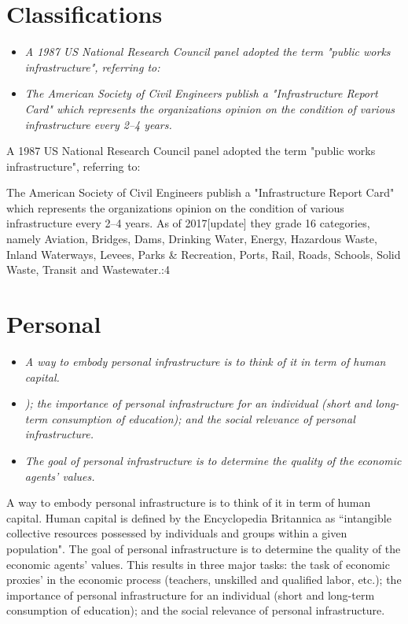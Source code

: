 \section{Classifications}\label{classifications}

\begin{itemize}
\item
  \emph{A 1987 US National Research Council panel adopted the term
  "public works infrastructure", referring to:}
\item
  \emph{The American Society of Civil Engineers publish a
  "Infrastructure Report Card" which represents the organizations
  opinion on the condition of various infrastructure every 2--4 years.}
\end{itemize}

A 1987 US National Research Council panel adopted the term "public works
infrastructure", referring to:

The American Society of Civil Engineers publish a "Infrastructure Report
Card" which represents the organizations opinion on the condition of
various infrastructure every 2--4 years. As of 2017{[}update{]} they
grade 16 categories, namely Aviation, Bridges, Dams, Drinking Water,
Energy, Hazardous Waste, Inland Waterways, Levees, Parks \& Recreation,
Ports, Rail, Roads, Schools, Solid Waste, Transit and Wastewater.:4

\section{Personal}\label{personal}

\begin{itemize}
\item
  \emph{A way to embody personal infrastructure is to think of it in
  term of human capital.}
\item
  \emph{); the importance of personal infrastructure for an individual
  (short and long-term consumption of education); and the social
  relevance of personal infrastructure.}
\item
  \emph{The goal of personal infrastructure is to determine the quality
  of the economic agents' values.}
\end{itemize}

A way to embody personal infrastructure is to think of it in term of
human capital. Human capital is defined by the Encyclopedia Britannica
as ``intangible collective resources possessed by individuals and groups
within a given population". The goal of personal infrastructure is to
determine the quality of the economic agents' values. This results in
three major tasks: the task of economic proxies' in the economic process
(teachers, unskilled and qualified labor, etc.); the importance of
personal infrastructure for an individual (short and long-term
consumption of education); and the social relevance of personal
infrastructure.

